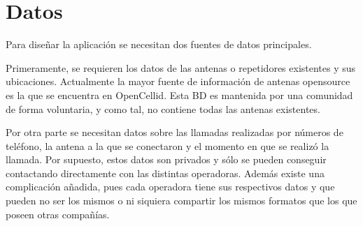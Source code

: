   \section{Datos}
    Para diseñar la aplicación se necesitan dos fuentes de datos principales.
    
    Primeramente, se requieren los datos de las antenas o repetidores existentes y sus ubicaciones. Actualmente la mayor fuente de información de antenas opensource es la que se encuentra en OpenCellid\cite{opencellid}. Esta BD es mantenida por una comunidad de forma voluntaria, y como tal, no contiene todas las antenas existentes.
    
    Por otra parte se necesitan datos sobre las llamadas realizadas por números de teléfono, la antena a la que se conectaron y el momento en que se realizó la llamada. Por supuesto, estos datos son privados y sólo se pueden conseguir contactando directamente con las distintas operadoras. Además existe una complicación añadida, pues cada operadora tiene sus respectivos datos y que pueden no ser los mismos o ni siquiera compartir los mismos formatos que los que poseen otras compañías.